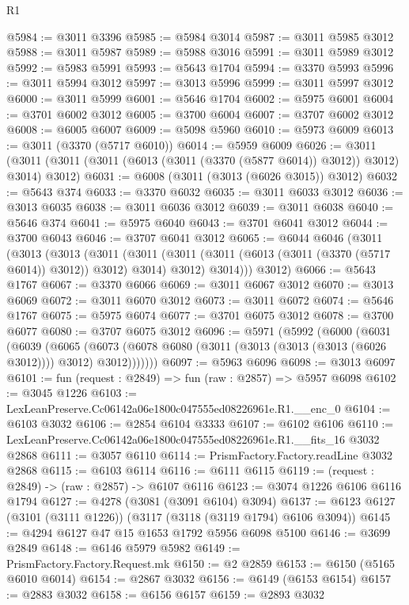 \begin{lexlean}{R1}
\begin{coremodule}
@5984 := @3011 @3396
@5985 := @5984 @3014
@5987 := @3011 @5985 @3012
@5988 := @3011 @5987
@5989 := @5988 @3016
@5991 := @3011 @5989 @3012
@5992 := @5983 @5991
@5993 := @5643 @1704
@5994 := @3370 @5993
@5996 := @3011 @5994 @3012
@5997 := @3013 @5996
@5999 := @3011 @5997 @3012
@6000 := @3011 @5999
@6001 := @5646 @1704
@6002 := @5975 @6001
@6004 := @3701 @6002 @3012
@6005 := @3700 @6004
@6007 := @3707 @6002 @3012
@6008 := @6005 @6007
@6009 := @5098 @5960
@6010 := @5973 @6009
@6013 := @3011 (@3370 (@5717 @6010))
@6014 := @5959 @6009
@6026 := @3011 (@3011 (@3011 (@3011 (@6013 (@3011 (@3370 (@5877 @6014)) @3012)) @3012) @3014) @3012)
@6031 := @6008 (@3011 (@3013 (@6026 @3015)) @3012)
@6032 := @5643 @374
@6033 := @3370 @6032
@6035 := @3011 @6033 @3012
@6036 := @3013 @6035
@6038 := @3011 @6036 @3012
@6039 := @3011 @6038
@6040 := @5646 @374
@6041 := @5975 @6040
@6043 := @3701 @6041 @3012
@6044 := @3700 @6043
@6046 := @3707 @6041 @3012
@6065 := @6044
    @6046
    (@3011
      (@3013
        (@3013
          (@3011
            (@3011 (@3011 (@3011 (@6013 (@3011 (@3370 (@5717 @6014)) @3012)) @3012) @3014) @3012)
            @3014)))
      @3012)
@6066 := @5643 @1767
@6067 := @3370 @6066
@6069 := @3011 @6067 @3012
@6070 := @3013 @6069
@6072 := @3011 @6070 @3012
@6073 := @3011 @6072
@6074 := @5646 @1767
@6075 := @5975 @6074
@6077 := @3701 @6075 @3012
@6078 := @3700 @6077
@6080 := @3707 @6075 @3012
@6096 := @5971
    (@5992
      (@6000
        (@6031
          (@6039
            (@6065
              (@6073 (@6078 @6080 (@3011 (@3013 (@3013 (@3013 (@6026 @3012)))) @3012) @3012)))))))
@6097 := @5963 @6096
@6098 := @3013 @6097
@6101 := fun (request : @2849) => fun (raw : @2857) => @5957 @6098
@6102 := @3045 @1226
@6103 := LexLeanPreserve.Cc06142a06e1800c047555ed08226961e.R1.__enc_0
@6104 := @6103 @3032
@6106 := @2854 @6104 @3333
@6107 := @6102 @6106
@6110 := LexLeanPreserve.Cc06142a06e1800c047555ed08226961e.R1.__fits_16 @3032 @2868
@6111 := @3057 @6110
@6114 := PrismFactory.Factory.readLine @3032 @2868
@6115 := @6103 @6114
@6116 := @6111 @6115
@6119 := (request : @2849) -> (raw : @2857) -> @6107 @6116
@6123 := @3074 @1226 @6106 @6116 @1794
@6127 := @4278 (@3081 (@3091 @6104) @3094)
@6137 := @6123 @6127 (@3101 (@3111 @1226)) (@3117 (@3118 (@3119 @1794) @6106 @3094))
@6145 := @4294 @6127 @47 @15 @1653 @1792 @5956 @6098 @5100
@6146 := @3699 @2849
@6148 := @6146 @5979 @5982
@6149 := PrismFactory.Factory.Request.mk
@6150 := @2 @2859
@6153 := @6150 (@5165 @6010 @6014)
@6154 := @2867 @3032
@6156 := @6149 (@6153 @6154)
@6157 := @2883 @3032
@6158 := @6156 @6157
@6159 := @2893 @3032

\end{coremodule}
\end{lexlean}
